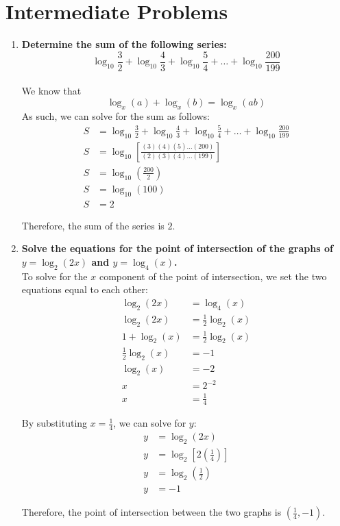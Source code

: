 \documentclass[12pt]{article}
\begin{document}
\section*{Intermediate Problems}
\begin{enumerate}
    \item \textbf{Determine the sum of the following series:
    \begin{equation*}
        \log_{10}\frac{3}{2} + \log_{10}\frac{4}{3} + \log_{10}\frac{5}{4} + \dots + \log_{10}\frac{200}{199}
    \end{equation*}} \\
    
    We know that $$\log_x(a) + \log_x(b) = \log_x(ab)$$ As such, we can solve for the sum as follows:
    \begin{align*}
        S &= \log_{10}\frac{3}{2} + \log_{10}\frac{4}{3} + \log_{10}\frac{5}{4} + \dots + \log_{10}\frac{200}{199} \\
        S &= \log_{10}[\frac{(3)(4)(5)\dots(200)}{(2)(3)(4)\dots(199)}] \\
        S &= \log_{10}(\frac{200}{2}) \\
        S &= \log_{10}(100) \\
        S &= 2
    \end{align*}
    
    Therefore, the sum of the series is $2$.
    
    \item \textbf{Solve the equations for the point of intersection of the graphs of $y = \log_2(2x)$ and $y = \log_4(x)$.} \\
    
    To solve for the $x$ component of the point of intersection, we set the two equations equal to each other:
    \begin{align*}
        \log_2(2x) &= \log_4(x) \\
        \log_2(2x) &= \frac{1}{2}\log_2(x) \\
        1 + \log_2(x) &= \frac{1}{2}\log_2(x) \\
        \frac{1}{2}\log_2(x) &= -1 \\
        \log_2(x) &= -2 \\
        x &= 2^{-2} \\
        x &= \frac{1}{4}
    \end{align*}
    
    By substituting $x = \frac{1}{4}$, we can solve for $y$:
    \begin{align*}
        y &= \log_2(2x) \\
        y &= \log_2[2(\frac{1}{4})] \\
        y &= \log_2(\frac{1}{2}) \\
        y &= -1
    \end{align*}
    
    Therefore, the point of intersection between the two graphs is $(\frac{1}{4}, -1)$.
    
\end{enumerate} \newpage
\end{document}
